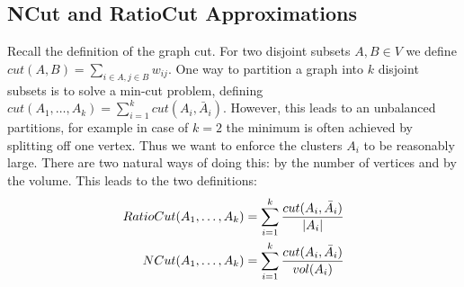 \subsection{NCut and RatioCut Approximations}

Recall the definition of the graph cut. For two disjoint subsets $A,B\in V$ we define $cut(A,B)=\sum_{i\in A,j\in B}w_{ij}$. One way to partition a graph into $k$ disjoint subsets is to solve a min-cut problem, defining $cut(A_1,\dotsc,A_k)=\sum_{i=1}^kcut(A_i,\bar{A}_i)$. However, this leads to an unbalanced partitions, for example in case of $k=2$ the minimum is often achieved by splitting off one vertex. Thus we want to enforce the clusters $A_i$ to be reasonably large. There are two natural ways of doing this: by the number of vertices and by the volume. This leads to the two definitions:
\begin{align*}
	RatioCut(A_1,\dotsc,A_k)&=\sum_{i=1}^k\frac{cut(A_i,\bar{A}_i)}{\left\vert A_i\right\vert} \\
	NCut(A_1,\dotsc,A_k)&=\sum_{i=1}^k\frac{cut(A_i,\bar{A}_i)}{vol(A_i)}
\end{align*}

